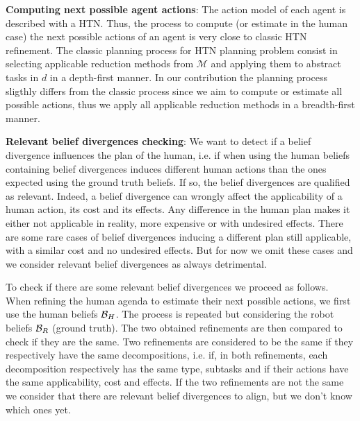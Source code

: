 \documentclass[letterpaper]{article} %
\begin{document}
\textbf{Computing next possible agent actions}:
The action model of each agent is described with a HTN. Thus, the process to compute (or estimate in the human case) the next possible actions of an agent is very close to classic HTN refinement.
The classic planning process for HTN planning problem consist in selecting applicable reduction methods from $\mathcal{M}$ and applying them to abstract tasks in $d$ in a depth-first manner. In our contribution the planning process sligthly differs from the classic process since we aim to compute or estimate all possible actions, thus we apply all applicable reduction methods in a breadth-first manner.

\textbf{Relevant belief divergences checking}:
We want to detect if a belief divergence influences the plan of the human, i.e. if when using the human beliefs containing belief divergences induces different human actions than the ones expected using the ground truth beliefs. If so, the belief divergences are qualified as relevant. Indeed, a belief divergence can wrongly affect the applicability of a human action, its cost and its effects. 
Any difference in the human plan makes it either not applicable in reality, more expensive or with undesired effects. There are some rare cases of belief divergences inducing a different plan still applicable, with a similar cost and no undesired effects. But for now we omit these cases and we consider relevant belief divergences as always detrimental.

To check if there are some relevant belief divergences we proceed as follows. When refining the human agenda to estimate their next possible actions, we first use the human beliefs $\mathcal{B}_H$. The process is repeated but considering the robot beliefs $\mathcal{B}_R$ (ground truth). The two obtained refinements are then compared to check if they are the same. Two refinements are considered to be the same if they respectively have the same decompositions, i.e. if, in both refinements, each decomposition respectively has the same type, subtasks and if their actions have the same applicability, cost and effects. If the two refinements are not the same we consider that there are relevant belief divergences to align, but we don't know which ones yet.
\end{document}
